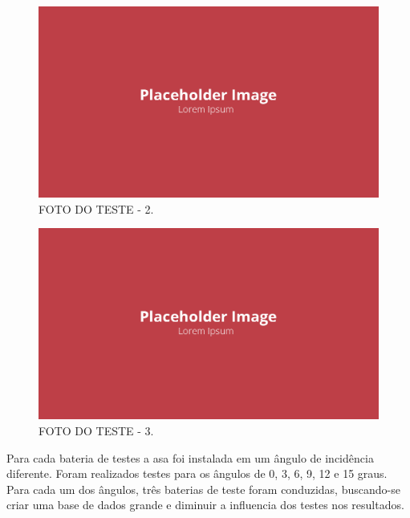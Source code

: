 \begin{figure}[!ht]
    \centering
    \includegraphics[width=.8\linewidth]{figuras/placeholder.png}
    \caption{FOTO DO TESTE - 2\cite{autor}.}
    \label{fig:placeholder}
\end{figure}

\begin{figure}[!ht]
    \centering
    \includegraphics[width=.8\linewidth]{figuras/placeholder.png}
    \caption{FOTO DO TESTE - 3\cite{autor}.}
    \label{fig:placeholder}
\end{figure}

Para cada bateria de testes a asa foi instalada em um ângulo de incidência diferente. Foram realizados testes para os ângulos de 0, 3, 6, 9, 12 e 15 graus. Para cada um dos ângulos, três baterias de teste foram conduzidas, buscando-se criar uma base de dados grande e diminuir a influencia dos testes nos resultados.

